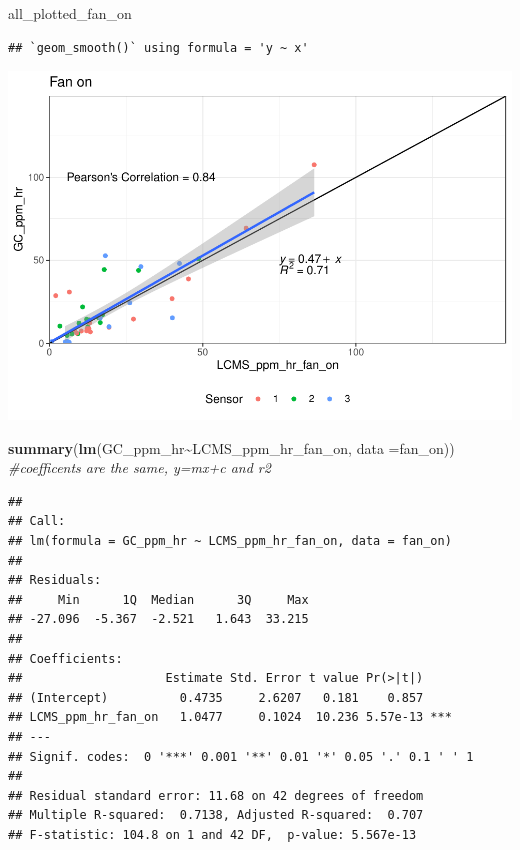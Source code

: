 \documentclass[
]{article}
\newenvironment{Shaded}{\begin{snugshade}}{\end{snugshade}}
\newcommand{\AttributeTok}[1]{\textcolor[rgb]{0.13,0.29,0.53}{#1}}
\newcommand{\CommentTok}[1]{\textcolor[rgb]{0.56,0.35,0.01}{\textit{#1}}}
\newcommand{\FunctionTok}[1]{\textcolor[rgb]{0.13,0.29,0.53}{\textbf{#1}}}
\newcommand{\NormalTok}[1]{#1}
\newcommand{\SpecialCharTok}[1]{\textcolor[rgb]{0.81,0.36,0.00}{\textbf{#1}}}
\begin{document}
\begin{Shaded}
\begin{Highlighting}[]
\NormalTok{all\_plotted\_fan\_on}
\end{Highlighting}
\end{Shaded}

\begin{verbatim}
## `geom_smooth()` using formula = 'y ~ x'
\end{verbatim}

\includegraphics{Initial_look_GC_LCMS_files/figure-latex/unnamed-chunk-6-1.pdf}

\begin{Shaded}
\begin{Highlighting}[]
\FunctionTok{summary}\NormalTok{(}\FunctionTok{lm}\NormalTok{(GC\_ppm\_hr}\SpecialCharTok{\textasciitilde{}}\NormalTok{LCMS\_ppm\_hr\_fan\_on, }\AttributeTok{data =}\NormalTok{fan\_on)) }\CommentTok{\#coefficents are the same, y=mx+c and r2}
\end{Highlighting}
\end{Shaded}

\begin{verbatim}
## 
## Call:
## lm(formula = GC_ppm_hr ~ LCMS_ppm_hr_fan_on, data = fan_on)
## 
## Residuals:
##     Min      1Q  Median      3Q     Max 
## -27.096  -5.367  -2.521   1.643  33.215 
## 
## Coefficients:
##                    Estimate Std. Error t value Pr(>|t|)    
## (Intercept)          0.4735     2.6207   0.181    0.857    
## LCMS_ppm_hr_fan_on   1.0477     0.1024  10.236 5.57e-13 ***
## ---
## Signif. codes:  0 '***' 0.001 '**' 0.01 '*' 0.05 '.' 0.1 ' ' 1
## 
## Residual standard error: 11.68 on 42 degrees of freedom
## Multiple R-squared:  0.7138, Adjusted R-squared:  0.707 
## F-statistic: 104.8 on 1 and 42 DF,  p-value: 5.567e-13
\end{verbatim}
\end{document}
